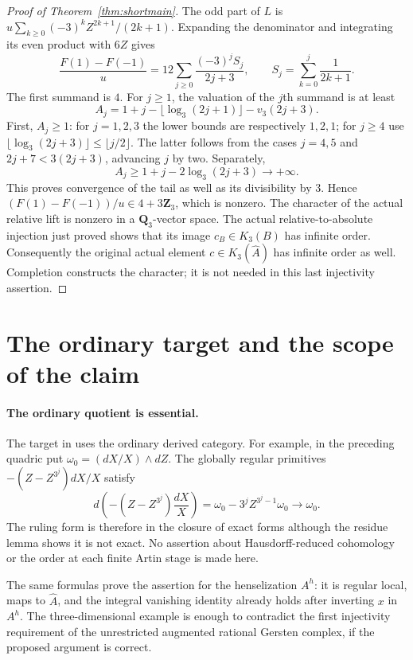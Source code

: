 \documentclass[11pt,a4paper]{article}
\theoremstyle{remark}
\begin{document}
\begin{proof}[Proof of Theorem~\ref{thm:shortmain}]
The odd part of $L$ is
$u\sum_{k\ge0}(-3)^kZ^{2k+1}/(2k+1)$. Expanding the denominator
and integrating its even product with $6Z$ gives
\[
 \frac{F(1)-F(-1)}u
     =12\sum_{j\ge0}\frac{(-3)^jS_j}{2j+3},
 \qquad S_j=\sum_{k=0}^j\frac1{2k+1}.
\]
The first summand is $4$. For $j\ge1$, the valuation of the $j$th
summand is at least
\[
 A_j=1+j-\lfloor\log_3(2j+1)\rfloor-v_3(2j+3).
\]
First, $A_j\ge1$: for $j=1,2,3$ the lower bounds are respectively
$1,2,1$; for $j\ge4$ use
$\lfloor\log_3(2j+3)\rfloor\le\lfloor j/2\rfloor$.
The latter follows from the cases $j=4,5$ and
$2j+7<3(2j+3)$, advancing $j$ by two. Separately,
\[
 A_j\ge1+j-2\log_3(2j+3)\longrightarrow+\infty.
\]
This proves convergence of the tail as well as its divisibility by
$3$. Hence $(F(1)-F(-1))/u\in4+3\mathbf Z_3$, which is nonzero.
The character of the actual relative lift is nonzero in a
$\mathbf Q_3$-vector space. The actual relative-to-absolute injection
just proved shows that its image $c_B\in K_3(B)$ has infinite order.
Consequently the original actual element $c\in K_3(\widehat A)$ has infinite
order as well. Completion constructs the character; it is not needed
in this last injectivity assertion.
\end{proof}
\section{The ordinary target and the scope of the claim}
\paragraph{The ordinary quotient is essential.}
The target in \cite[Constructions~4.6 and~4.11]{AMMN} uses the
ordinary derived category. For example, in the preceding quadric put
$\omega_0=(dX/X)\wedge dZ$. The globally regular primitives
$-(Z-Z^{3^j})dX/X$ satisfy
\[
 d\!\left(-(Z-Z^{3^j})\frac{dX}{X}\right)
   =\omega_0-3^jZ^{3^j-1}\omega_0\longrightarrow\omega_0.
\]
The ruling form is therefore in the closure of exact forms although
the residue lemma shows it is not exact. No assertion about
Hausdorff-reduced cohomology or the order at each finite Artin stage
is made here.


The same formulas prove the assertion for the henselization $A^h$:
it is regular local, maps to $\widehat A$, and the integral vanishing
identity already holds after inverting $x$ in $A^h$.
The three-dimensional example is enough to contradict the first
injectivity requirement of the unrestricted augmented rational
Gersten complex, if the proposed argument is correct.
\end{document}
